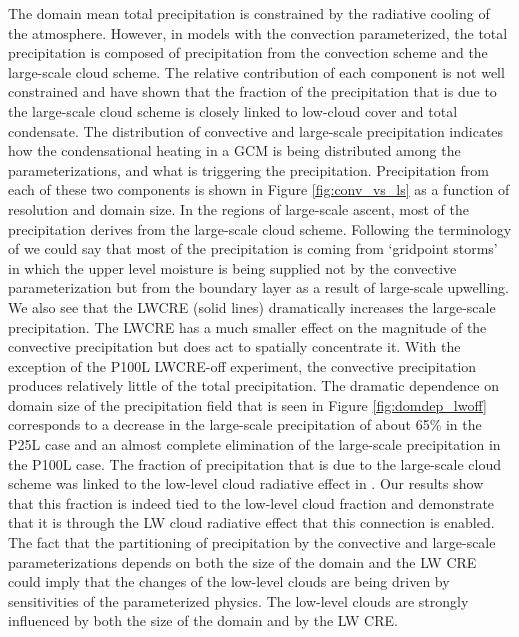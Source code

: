 \documentclass[draft]{agujournal2019}
\begin{document}
{The domain mean total precipitation is constrained by the radiative cooling of the atmosphere.  
However, in models with the convection parameterized, the 
total precipitation is composed of precipitation from the convection scheme and the large-scale cloud scheme. 
The relative contribution of each component is not well constrained and  have shown 
that the fraction of the precipitation that is due to the large-scale cloud scheme is closely linked 
to low-cloud cover and total condensate.  
The distribution of convective and large-scale precipitation indicates how the condensational heating
in a GCM is being distributed among the parameterizations, and what is triggering the precipitation.  
Precipitation from each of these two components is shown in Figure \ref{fig:conv_vs_ls} as a function of 
resolution and domain size.  In the regions of large-scale ascent, most of the precipitation derives 
from the large-scale cloud scheme.  Following the terminology of  we could say that most 
of the precipitation is coming from `gridpoint storms' in which the upper level moisture is being supplied not 
by the convective parameterization but from the boundary layer as a result of large-scale upwelling.
We also see that the LWCRE (solid lines) dramatically increases the large-scale precipitation.  
The LWCRE has a much smaller effect on the magnitude of the convective precipitation but does act to spatially concentrate it.  
With the exception of the P100L LWCRE-off experiment, the convective precipitation produces relatively little of the total precipitation.  
The dramatic dependence on domain size of the precipitation field that is 
seen in Figure \ref{fig:domdep_lwoff} corresponds to a decrease in the large-scale precipitation of about 65\% in the P25L case
and an almost complete elimination of the large-scale precipitation in the P100L case.    
The fraction of precipitation that is due to the large-scale cloud scheme was linked to the low-level cloud radiative
effect in . Our results show that this fraction is indeed tied to the low-level cloud fraction  
and demonstrate that it is through the LW cloud radiative effect that this connection is enabled.
The fact that the partitioning of precipitation by the convective and large-scale 
parameterizations depends on both the size of the domain and the LW CRE 
could imply that the changes of the low-level clouds are being driven by 
sensitivities of the parameterized physics.   
The low-level clouds are strongly influenced by both the size of the domain and by the LW CRE. 

}
\end{document}
